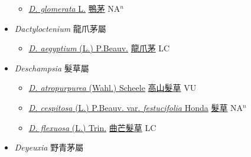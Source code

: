 \begin{itemize}
  \begin{itemize}
        \item[] \href{http://www.theplantlist.org/tpl1.1/search?q=Dactylis+glomerata}{\textit{D. glomerata} L.}   \href{\detokenize{http://taibnet.sinica.edu.tw/chi/taibnet_species_list.php?T2=鴨茅&T2_new_value=true&fr=y}}{鴨茅} NA$^n$
  \end{itemize}
 \item[] \textit{Dactyloctenium} 龍爪茅屬
                    
  \begin{itemize}
        \item[] \href{http://www.theplantlist.org/tpl1.1/search?q=Dactyloctenium+aegyptium}{\textit{D. aegyptium} (L.) P.Beauv.}   \href{\detokenize{http://taibnet.sinica.edu.tw/chi/taibnet_species_list.php?T2=龍爪茅&T2_new_value=true&fr=y}}{龍爪茅} LC
  \end{itemize}
 \item[] \textit{Deschampsia} 髮草屬
                    
  \begin{itemize}
        \item[] \href{http://www.theplantlist.org/tpl1.1/search?q=Deschampsia+atropurpurea}{\textit{D. atropurpurea} (Wahl.) Scheele}   \href{\detokenize{http://taibnet.sinica.edu.tw/chi/taibnet_species_list.php?T2=高山髮草&T2_new_value=true&fr=y}}{高山髮草} VU
        \item[] \href{http://www.theplantlist.org/tpl1.1/search?q=Deschampsia+cespitosa+var.+festucifolia}{\textit{D. cespitosa} (L.) P.Beauv. var. \textit{festucifolia} Honda}   \href{\detokenize{http://taibnet.sinica.edu.tw/chi/taibnet_species_list.php?T2=髮草&T2_new_value=true&fr=y}}{髮草} NA$^n$
        \item[] \href{http://www.theplantlist.org/tpl1.1/search?q=Deschampsia+flexuosa}{\textit{D. flexuosa} (L.) Trin.}   \href{\detokenize{http://taibnet.sinica.edu.tw/chi/taibnet_species_list.php?T2=曲芒髮草&T2_new_value=true&fr=y}}{曲芒髮草} LC
  \end{itemize}
 \item[] \textit{Deyeuxia} 野青茅屬
                    

\end{itemize}
